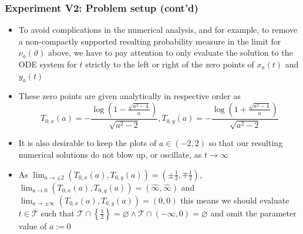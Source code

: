 \documentclass[usenames,svgnames,dvipsnames,10pt]{beamer}
\begin{document}
\begin{frame}
\frametitle{Experiment V2: Problem setup (cont'd)}

\begin{itemize} 

\item To avoid complications in the numerical analysis, and for example, to remove a non-compactly supported 
      resulting probability measure in the limit for $\nu_a(\vartheta)$ above, we have to pay attention to 
      only evaluate the solution to the ODE system for $t$ strictly to the left or right of the zero points of 
      $x_a(t)$ and $y_a(t)$ 
\item These zero points are given analytically in respective order as 
      \[
      T_{0,x}(a) = -\frac{\log\left(1-\frac{\sqrt{a^2-4}}{a}\right)}{\sqrt{a^2-2}}, 
      T_{0,y}(a) = -\frac{\log\left(1+\frac{\sqrt{a^2-4}}{a}\right)}{\sqrt{a^2-2}}
      \]
\item It is also desirable to keep the plots of $a \in (-2, 2)$ so that our resulting numerical solutions 
      do not blow up, or oscillate, as $t \rightarrow \infty$ 
\item As $\lim_{a \rightarrow \pm 2} (T_{0,x}(a), T_{0,y}(a)) = \left(\pm \frac{1}{2}, \mp \frac{1}{2}\right)$, 
      $\lim_{a \rightarrow 0} (T_{0,x}(a), T_{0,y}(a)) = \left(\widehat{\infty}, \widehat{\infty}\right)$ and 
      $\lim_{a \rightarrow \pm \infty} (T_{0,x}(a), T_{0,y}(a)) = (0, 0)$
      this means we should evaluate $t \in \mathcal{T}$ such that 
      $\mathcal{T} \cap \left\{\frac{1}{2}\right\} = \varnothing \wedge \mathcal{T} \cap (-\infty, 0) = \varnothing$ 
      and omit the parameter value of $a := 0$

\end{itemize} 

\end{frame}
\end{document}
